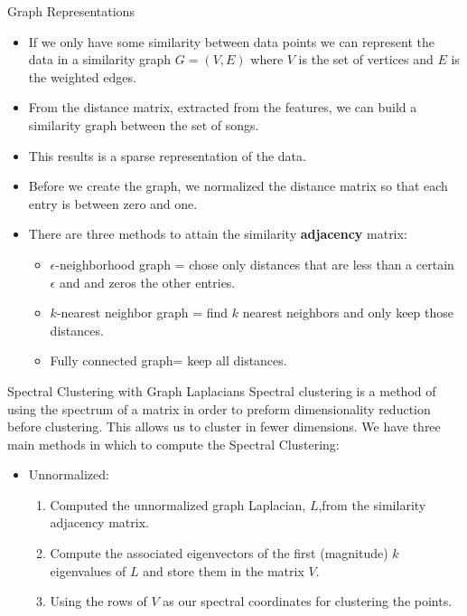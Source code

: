 \documentclass[xcolor=dvipsnames,t]{beamer} %
\begin{document}
\begin{frame}{Graph Representations}
\begin{itemize}
\item If we only have some similarity between data points we can represent the data in a similarity graph $G = (V,E)$ where $V$ is the set of vertices and $E$ is the weighted edges. 
\item From the distance matrix, extracted from the features, we can build a similarity graph between the set of songs. 
\item This results is a sparse representation of the data.
\item Before we create the graph, we normalized the distance matrix so that  each entry is between zero and one. 
\item There are three methods to attain the similarity {\bf{adjacency}} matrix:
\begin{itemize}
\item  $\epsilon$-neighborhood graph = chose only distances that are less than a certain $\epsilon$ and and zeros the other entries. 
\item $k$-nearest neighbor graph = find $k$ nearest neighbors and only keep those distances.
\item Fully connected graph= keep all distances. 
\end{itemize}
\end{itemize}
\end{frame}

\begin{frame}{Spectral Clustering with Graph Laplacians}
Spectral clustering is a method of using the spectrum of a matrix in order to preform dimensionality reduction before clustering. This allows us to cluster in fewer dimensions. We have three main  methods in which to compute the Spectral Clustering:
\begin{itemize}
\item Unnormalized:
\begin{enumerate}
\item Computed the unnormalized graph Laplacian, $L$,from the similarity adjacency matrix.  
\item Compute the associated eigenvectors of the first (magnitude) $k$ eigenvalues of $L$ and store them in the matrix $V$. 
\item Using the rows of $V$  as our spectral coordinates for clustering the points. 
\end{enumerate}
\end{itemize}
\end{frame}
\end{document}
